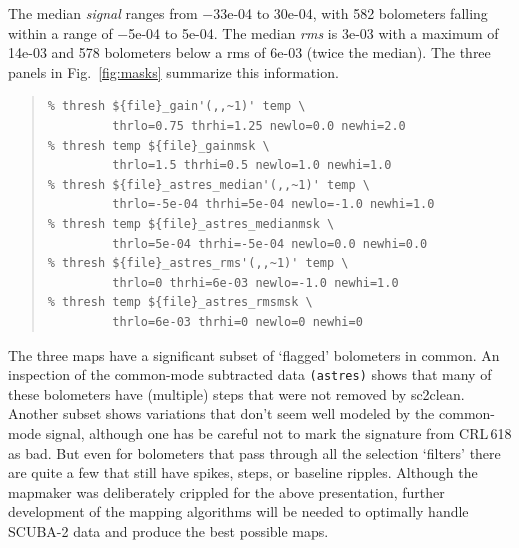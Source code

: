 \documentclass[twoside,11pt]{article}
\newcommand{\xref}[3]{#1}
\renewcommand{\_}{\texttt{\symbol{95}}}
\newenvironment{myquote}{\begin{quote}\begin{small}}{\end{small}\end{quote}}
\newcommand{\task}[1]{\textsf{#1}}
\newcommand{\clean}{\xref{\task{sc2clean}}{sun258}{SC2CLEAN}}
\begin{document}
The median \textsl{signal} ranges from $-$33e-04 to 30e-04, with 582
bolometers falling within a range of $-$5e-04 to 5e-04. The median
\textsl{rms} is 3e-03 with a maximum of 14e-03 and 578 bolometers
below a rms of 6e-03 (twice the median).  The three panels in
Fig.~\ref{fig:masks} summarize this information.

\begin{myquote}
\begin{verbatim}
% thresh ${file}_gain'(,,~1)' temp \
         thrlo=0.75 thrhi=1.25 newlo=0.0 newhi=2.0
% thresh temp ${file}_gainmsk \
         thrlo=1.5 thrhi=0.5 newlo=1.0 newhi=1.0
% thresh ${file}_astres_median'(,,~1)' temp \
         thrlo=-5e-04 thrhi=5e-04 newlo=-1.0 newhi=1.0
% thresh temp ${file}_astres_medianmsk \
         thrlo=5e-04 thrhi=-5e-04 newlo=0.0 newhi=0.0
% thresh ${file}_astres_rms'(,,~1)' temp \
         thrlo=0 thrhi=6e-03 newlo=-1.0 newhi=1.0
% thresh temp ${file}_astres_rmsmsk \
         thrlo=6e-03 thrhi=0 newlo=0 newhi=0
\end{verbatim}
\end{myquote}

The three maps have a significant subset of `flagged' bolometers in
common.  An inspection of the common-mode subtracted data \texttt{(\_astres)}
shows that many of these bolometers have (multiple) steps that were
not removed by \clean.  Another subset shows variations that don't
seem well modeled by the common-mode signal, although one has be
careful not to mark the signature from CRL\,618 as bad. But even for
bolometers that pass through all the selection `filters' there are
quite a few that still have spikes, steps, or baseline ripples.
Although the mapmaker was deliberately crippled for the above
presentation, further development of the mapping algorithms will be
needed to optimally handle SCUBA-2 data and produce the best possible
maps.
\end{document}
